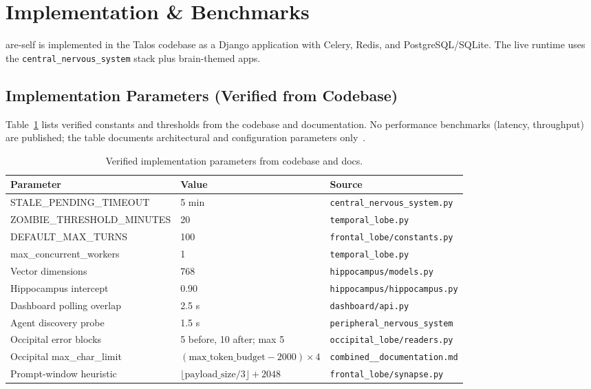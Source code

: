 \documentclass[11pt]{article}
\begin{document}
	\section{Implementation \& Benchmarks}
	\label{sec:benchmarks}

	are-self is implemented in the Talos codebase as a Django application with Celery, Redis, and PostgreSQL/SQLite. The live runtime uses the \texttt{central\_nervous\_system} stack plus brain-themed apps.

	\subsection{Implementation Parameters (Verified from Codebase)}
	Table~\ref{tab:params} lists verified constants and thresholds from the codebase and documentation. No performance benchmarks (latency, throughput) are published; the table documents architectural and configuration parameters only~\cite{talosLiveCodebase,talosCombined,talosCNS,talosFrontal,talosTemporal,talosHippocampus,talosOccipital,talosPNS}.

	\begin{table}[ht]
		\centering
		\caption{Verified implementation parameters from codebase and docs.}
		\label{tab:params}
		\small
		\begin{tabular}{@{}llp{4.2cm}@{}}
			\toprule
			\textbf{Parameter} & \textbf{Value} & \textbf{Source} \\
			\midrule
			STALE\_PENDING\_TIMEOUT & 5 min & \texttt{central\_nervous\_system.py} \\
			ZOMBIE\_THRESHOLD\_MINUTES & 20 & \texttt{temporal\_lobe.py} \\
			DEFAULT\_MAX\_TURNS & 100 & \texttt{frontal\_lobe/constants.py} \\
			max\_concurrent\_workers & 1 & \texttt{temporal\_lobe.py} \\
			Vector dimensions & 768 & \texttt{hippocampus/models.py} \\
			Hippocampus intercept & 0.90 & \texttt{hippocampus/hippocampus.py} \\
			Dashboard polling overlap & 2.5 s & \texttt{dashboard/api.py} \\
			Agent discovery probe & 1.5 s & \texttt{peripheral\_nervous\_system} \\
			Occipital error blocks & 5 before, 10 after; max 5 & \texttt{occipital\_lobe/readers.py} \\
			Occipital max\_char\_limit & $(\text{max\_token\_budget} - 2000) \times 4$ & \texttt{combined\_\_documentation.md} \\
			Prompt-window heuristic & $\lfloor \text{payload\_size}/3 \rfloor + 2048$ & \texttt{frontal\_lobe/synapse.py} \\
			\bottomrule
		\end{tabular}
	\end{table}
\end{document}
